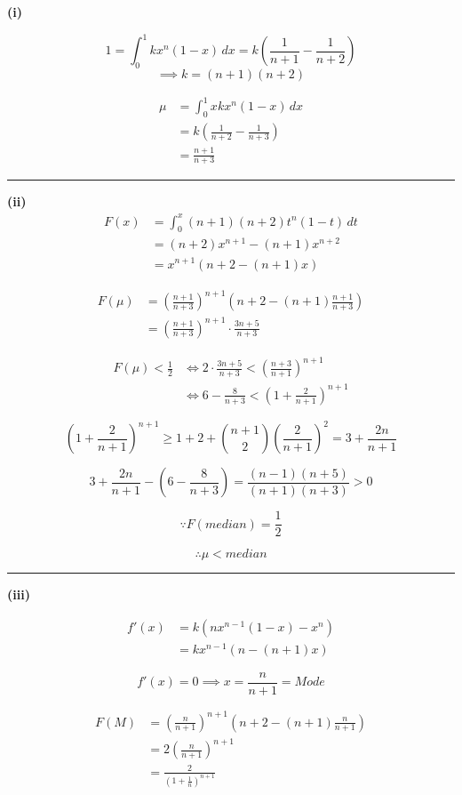 \documentclass[12pt]{article}
\begin{document}
\newcommand{\ds}{\displaystyle}

\textbf{(i)}

$$1=\int_0^1 kx^n(1-x)\,dx=k\left(\frac1{n+1}-\frac1{n+2}\right)$$
$$\implies k=(n+1)(n+2)$$

\begin{align*}
\mu&=\int_0^1 xkx^n(1-x)\,dx\\
&=k\left(\frac1{n+2}-\frac1{n+3}\right)\\
&=\frac{n+1}{n+3}
\end{align*}

\bigskip\hrule\bigskip

\textbf{(ii)}
\begin{align*}
F(x)
&=\int_0^x (n+1)(n+2)t^n(1-t)\,dt\\
&=(n+2)x^{n+1}-(n+1)x^{n+2}\\
&=x^{n+1}\left(n+2-(n+1)x\right)
\end{align*}

\begin{align*}
F(\mu)&=\left(\frac{n+1}{n+3}\right)^{n+1}\left(n+2-(n+1)\frac{n+1}{n+3}\right)\\
&=\left(\frac{n+1}{n+3}\right)^{n+1}\cdot\frac{3n+5}{n+3}
\end{align*}

\begin{align*}
F(\mu)<\frac12
&\iff
2\cdot\frac{3n+5}{n+3}
<
\left(\frac{n+3}{n+1}\right)^{n+1}\\
&\iff
6-\frac8{n+3}
<
\left(1+\frac2{n+1}\right)^{n+1}
\end{align*}

$$\left(1+\frac2{n+1}\right)^{n+1}\geq 1+2+\binom{n+1}{2}\left(\frac2{n+1}\right)^2=3+\frac{2n}{n+1}$$

$$3+\frac{2n}{n+1}-\left(6-\frac8{n+3}\right)=\frac{(n-1)(n+5)}{(n+1)(n+3)}>0$$

$$\because F(median)=\frac12$$

$$\therefore \mu < median$$

\bigskip\hrule\bigskip

\textbf{(iii)}

\begin{align*}
f'(x)
&=k\left(nx^{n-1}(1-x)-x^n\right)\\
&=kx^{n-1}\left(n-(n+1)x\right)
\end{align*}

$$f'(x)=0\implies x=\frac n{n+1}=Mode$$

\begin{align*}
F(M)
&=\left(\frac n{n+1}\right)^{n+1}
\left(n+2-(n+1)\frac n{n+1}\right)\\
&=2\left(\frac n{n+1}\right)^{n+1}\\
&=\frac{2}{\left(1+\frac1n\right)^{n+1}}
\end{align*}
\end{document}
